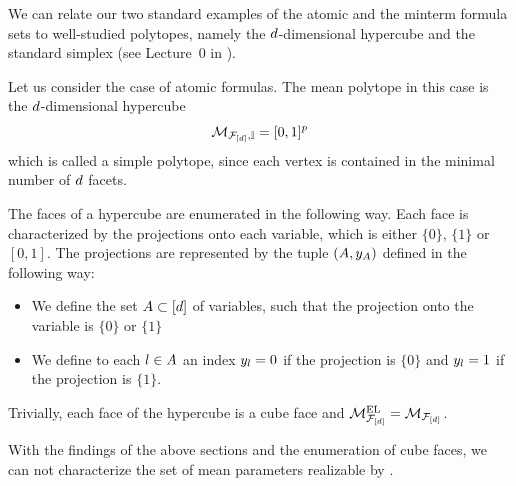 
We can relate our two standard examples of the atomic and the minterm formula sets to well-studied polytopes, namely the $d$-dimensional hypercube and the standard simplex (see Lecture~0 in \cite{ziegler_lectures_2013}).

\begin{example}
    \label{exa:atomicFormulasHypercube}
    Let us consider the case of atomic formulas. %
    The mean polytope in this case is the $d$-dimensional hypercube
    \begin{align*}
        \mathcal{M}_{\mathcal{F}_{[d]},\mathbb{I}} = [0,1]^{p}
    \end{align*}
    which is called a simple polytope, since each vertex is contained in the minimal number of $d$ facets.

    The faces of a hypercube are enumerated in the following way.
    Each face is characterized by the projections onto each variable, which is either $\{0\}$, $\{1\}$ or $[0,1]$.
    The projections are represented by the tuple $(A,y_{A})$ defined in the following way:
    \begin{itemize}
        \item We define the set $A\subset[d]$ of variables, such that the projection onto the variable is $\{0\}$ or $\{1\}$
        \item We define to each $l\in A$ an index $y_{l}=0$ if the projection is $\{0\}$ and $y_{l}=1$ if the projection is $\{1\}$.
    \end{itemize}


    Trivially, each face of the hypercube is a cube face and $\mathcal{M}^{\mathrm{EL}}_{\mathcal{F}_{[d]}}=\mathcal{M}_{\mathcal{F}_{[d]}}$.
\end{example}

With the findings of the above sections and the enumeration of cube faces, we can not characterize the set of mean parameters realizable by \HybridLogicNetworks{}.

